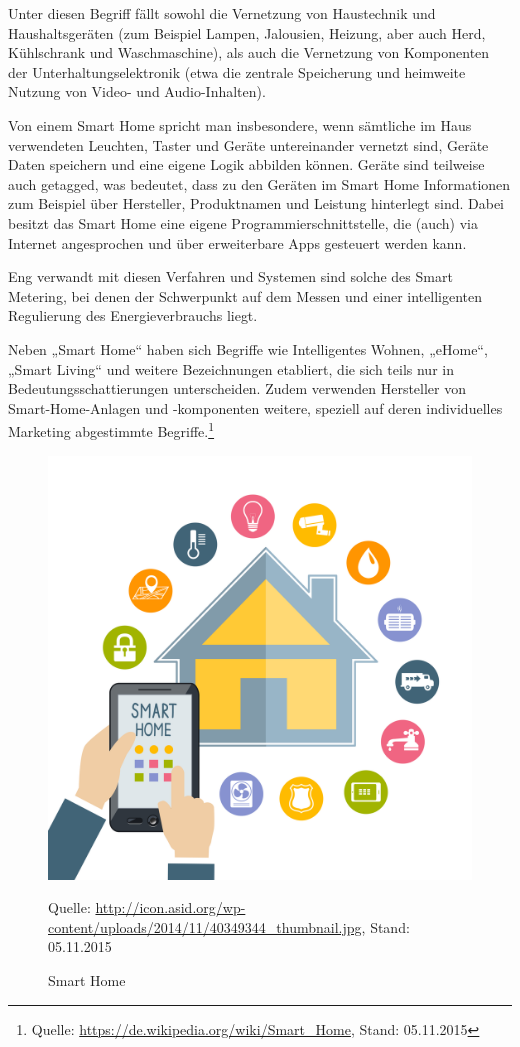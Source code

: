 Unter diesen Begriff fällt sowohl die Vernetzung von Haustechnik und Haushaltsgeräten (zum Beispiel Lampen, Jalousien, Heizung, aber auch Herd, Kühlschrank und Waschmaschine), als auch die Vernetzung von Komponenten der Unterhaltungselektronik (etwa die zentrale Speicherung und heimweite Nutzung von Video- und Audio-Inhalten).

Von einem Smart Home spricht man insbesondere, wenn sämtliche im Haus verwendeten Leuchten, Taster und Geräte untereinander vernetzt sind, Geräte Daten speichern und eine eigene Logik abbilden können. Geräte sind teilweise auch getagged, was bedeutet, dass zu den Geräten im Smart Home Informationen zum Beispiel über Hersteller, Produktnamen und Leistung hinterlegt sind. Dabei besitzt das Smart Home eine eigene Programmierschnittstelle, die (auch) via Internet angesprochen und über erweiterbare Apps gesteuert werden kann.

Eng verwandt mit diesen Verfahren und Systemen sind solche des Smart Metering, bei denen der Schwerpunkt auf dem Messen und einer intelligenten Regulierung des Energieverbrauchs liegt.

Neben „Smart Home“ haben sich Begriffe wie Intelligentes Wohnen, „eHome“, „Smart Living“ und weitere Bezeichnungen etabliert, die sich teils nur in Bedeutungsschattierungen unterscheiden. Zudem verwenden Hersteller von Smart-Home-Anlagen und -komponenten weitere, speziell auf deren individuelles Marketing abgestimmte Begriffe.\footnote{Quelle: \url{https://de.wikipedia.org/wiki/Smart_Home}, Stand: 05.11.2015}
\begin{figure}[h]
  \centering
  \includegraphics[scale=0.75]{98_Bilder/03_Marktsegmente/smarthome}
  \caption[Smart Home Symbolbild]{Smart Home}
  \footnotesize Quelle: \url{http://icon.asid.org/wp-content/uploads/2014/11/40349344_thumbnail.jpg}, Stand: 05.11.2015
\end{figure}
\newpage

